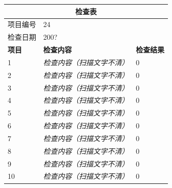 \documentclass[UTF8,10pt,a4paper,fontset=fandol]{ctexart}
\newcommand{\fieldvalue}[1]{#1}
\newcommand{\handwritten}[1]{#1}
\begin{document}
\begin{tabularx}{\textwidth}{|l|X|l|}
\hline
\multicolumn{3}{|c|}{\textbf{检查表}}\\
\hline
项目编号 &
\multicolumn{2}{l|}{%
\fieldvalue{\handwritten{24}}%
}\\
\hline
检查日期 &
\multicolumn{2}{l|}{%
\fieldvalue{\handwritten{200?}}%
}\\
\hline
\textbf{项目} & \textbf{检查内容} & \textbf{检查结果}\\
\hline
1 & \textit{检查内容（扫描文字不清）} &
\fieldvalue{\handwritten{0}}\\
\hline
2 & \textit{检查内容（扫描文字不清）} &
\fieldvalue{\handwritten{0}}\\
\hline
3 & \textit{检查内容（扫描文字不清）} &
\fieldvalue{\handwritten{0}}\\
\hline
4 & \textit{检查内容（扫描文字不清）} &
\fieldvalue{\handwritten{0}}\\
\hline
5 & \textit{检查内容（扫描文字不清）} &
\fieldvalue{\handwritten{0}}\\
\hline
6 & \textit{检查内容（扫描文字不清）} &
\fieldvalue{\handwritten{0}}\\
\hline
7 & \textit{检查内容（扫描文字不清）} &
\fieldvalue{\handwritten{0}}\\
\hline
8 & \textit{检查内容（扫描文字不清）} &
\fieldvalue{\handwritten{0}}\\
\hline
9 & \textit{检查内容（扫描文字不清）} &
\fieldvalue{\handwritten{0}}\\
\hline
10 & \textit{检查内容（扫描文字不清）} &
\fieldvalue{\handwritten{0}}\\

\end{tabularx}
\end{document}

